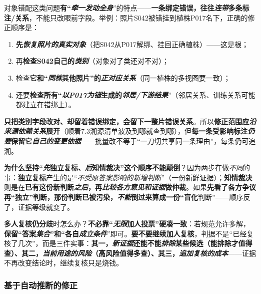 对象错配这类问题\textbf{有“\emph{牵一发动全身}}”的特点——\textbf{一条绑定错误，往往\emph{连带}多条标注/关系}，不能只改眼前字段。举例：照片S042被错挂到植株P017名下，正确的修正顺序是：
\begin{enumerate}\item \textbf{先\emph{恢复照片的真实对象}}（把S042从P017解绑、挂回正确植株）——这是根；\item 再\textbf{检查S042自己的\emph{类别}}（对象对了类还对不对）；\item 检查\textbf{它和“\emph{同株}其他照片”的\emph{正对应关系}}（同一植株的多视图要一致）；\item 还要\textbf{检查所有“\emph{以P017为锚}生成的\emph{邻居/下游结果}}”（邻居关系、训练关系可能都建立在错绑上）。\end{enumerate}
\textbf{只把类别字段改对、却留着错误绑定，会留下一整片错误关系}。所以\textbf{修正范围应\emph{沿来源依赖关系}展开}（顺着7.3溯源清单波及到哪就查到哪），但\textbf{每一条受影响标注\emph{仍要}保留它\emph{自己的变更依据}}——批量改不等于“一刀切共享同一条理由”，每条仍可追溯。

\textbf{为什么坚持“\emph{先}独立复标、\emph{后}知情裁决”这个顺序不能颠倒}？因为两步在做\emph{不同}的事：\textbf{独立复标}产生的是“\emph{不受原答案影响的\emph{新增判断}}”（一份新鲜证据）；\textbf{知情裁决}则是在\textbf{已有这份新判断\emph{之后}，再\emph{比较各方意见和证据}做仲裁}。如果\textbf{先看了各方争议再“独立”判断，那份判断已被污染，\emph{不能}倒过来算成一份“盲化}判断”——顺序反了，证据等级就变了。

\textbf{多人复核仍分歧}时怎么办？\textbf{不必靠“\emph{无限}加人投票”硬凑一致}：若规范允许多解，\textbf{保留“答案\emph{集合}”和“各自\emph{成立条件}}”即可。\textbf{要不要继续加人复核}，判据不是“已经复核了几次”，而是三件实事：\textbf{其一，\emph{新证据}还能不能\emph{排除}某些候选（能排除才值得查）、其二，\emph{当前用途的风险}（高风险值得多查）、其三，\emph{追加复核的成本}}——证据不再改变结论时，继续复核只是烧钱。

\subsubsection{基于自动推断的修正}
\label{sec:knowledge-quality-assessment-correction-automatic-repair}

